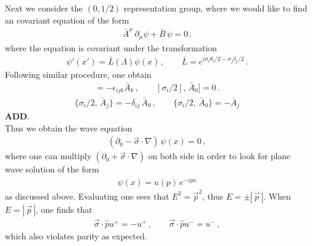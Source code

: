 \documentclass[11pt, onesided]{book}
\theoremstyle{break}
\theoremstyle{break}
\newcommand{\pd}{\partial}
\begin{document}
Next we consider the $(0,1/2)$ representation group, where we would like to find an covariant equation of the form
\begin{align*}
\bar{A}^\mu \,\pd_\mu \psi + \bar{B}\,\psi = 0\,.
\end{align*}
where the equation is covariant under the transformation
\begin{align*}
\psi'(x') = \bar{L}(\Lambda) \psi(x)\,,\qquad
\bar{L} = e^{i\sigma_i\theta_i/2 - \sigma_j \delta_j /2}\,.
\end{align*}
Following similar procedure, one obtain
\begin{align*}
[\sigma_i/2, \, \bar{A}_j] = -\epsilon_{ijk}\bar{A}_k\,,\qquad
[\sigma_i/2],\, \bar{A}_0] = 0\,.
\end{align*}
\begin{align*}
\{\sigma_i/2,\, \bar{A}_j\} = -\delta_{ij}\,\bar{A}_0\,,\qquad
\{ \sigma_i/2,\, \bar{A}_0\} = -\bar{A}_j
\end{align*}
\textbf{ADD}.\\

Thus we obtain the wave equation
\begin{align*}
\left(\pd_0 - \vec{\sigma}\cdot \nabla\right) \,\psi(x) =0\,,
\end{align*}
where one can multiply $(\pd_0  + \vec{\sigma}\cdot \nabla)$ on both side in order to look for plane wave solution of the form
\begin{align*}
\psi(x) = u(p) \, e^{-ipx}
\end{align*}
as discussed above. Evaluating one sees that $E^2 = \vec{p}^2$, thus $E = \pm |\,\vec{p}\,|$. When $E = |\,\vec{p}\,|$, one finds that
\begin{align*}
\vec{\sigma}\cdot \hat{p}u^+ = -u^+ \,,\qquad
\vec{\sigma}\cdot \hat{p}u^- = u^-\,,
\end{align*}
which also violates parity as expected.\\
\end{document}

